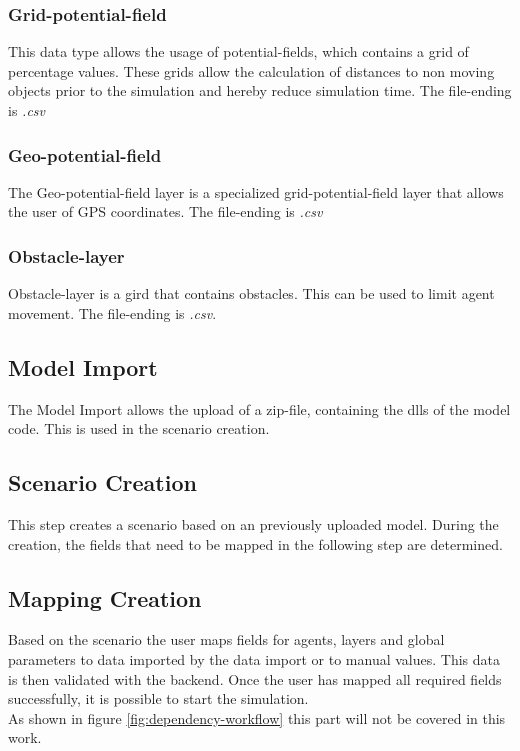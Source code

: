 \subsubsection{Grid-potential-field}
This data type allows the usage of potential-fields, which contains a grid of percentage values. These grids allow the calculation of distances to non moving objects prior to the simulation and hereby reduce simulation time. The file-ending is \textit{.csv}

\subsubsection{Geo-potential-field}
The Geo-potential-field layer is a specialized grid-potential-field layer that allows the user of GPS coordinates. The file-ending is \textit{.csv}

\subsubsection{Obstacle-layer}
Obstacle-layer is a gird that contains obstacles. This can be used to limit agent movement. The file-ending is \textit{.csv}.


\subsection{Model Import}
The Model Import allows the upload of a zip-file, containing the dlls of the model code. This is used in the scenario creation.


\subsection{Scenario Creation}
This step creates a scenario based on an previously uploaded model. During the creation, the fields that need to be mapped in the following step are determined.


\subsection{Mapping Creation}
Based on the scenario the user maps fields for agents, layers and global parameters to data imported by the data import or to manual values. This data is then validated with the backend. Once the user has mapped all required fields successfully, it is possible to start the simulation.\\
As shown in figure \ref{fig:dependency-workflow} this part will not be covered in this work.



